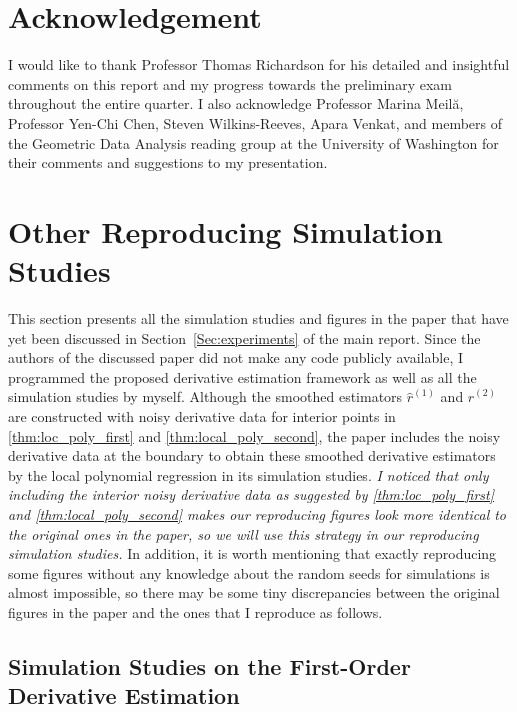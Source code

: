\documentclass{uwstat572}
\theoremstyle{definition}
\renewcommand{\hat}{\widehat}
\theoremstyle{theorem}
\begin{document}
\pagebreak

\section*{Acknowledgement}

I would like to thank Professor Thomas Richardson for his detailed and insightful comments on this report and my progress towards the preliminary exam throughout the entire quarter. I also acknowledge Professor Marina Meil\u{a}, Professor Yen-Chi Chen, Steven Wilkins-Reeves, Apara Venkat, and members of the Geometric Data Analysis reading group at the University of Washington for their comments and suggestions to my presentation.



\appendix

\section{Other Reproducing Simulation Studies}
\label{App:repro}

This section presents all the simulation studies and figures in the paper \citep{liu2020smoothed} that have yet been discussed in Section~\ref{Sec:experiments} of the main report. Since the authors of the discussed paper did not make any code publicly available, I programmed the proposed derivative estimation framework as well as all the simulation studies by myself. Although the smoothed estimators $\hat{r}^{(1)}$ and $\hat{r}^{(2)}$ are constructed with noisy derivative data for interior points in \autoref{thm:loc_poly_first} and \autoref{thm:local_poly_second}, the paper includes the noisy derivative data at the boundary to obtain these smoothed derivative estimators by the local polynomial regression in its simulation studies. \emph{I noticed that only including the interior noisy derivative data as suggested by \autoref{thm:loc_poly_first} and \autoref{thm:local_poly_second} makes our reproducing figures look more identical to the original ones in the paper, so we will use this strategy in our reproducing simulation studies.} In addition, it is worth mentioning that exactly reproducing some figures without any knowledge about the random seeds for simulations is almost impossible, so there may be some tiny discrepancies between the original figures in the paper and the ones that I reproduce as follows.

\subsection{Simulation Studies on the First-Order Derivative Estimation}
\end{document}
